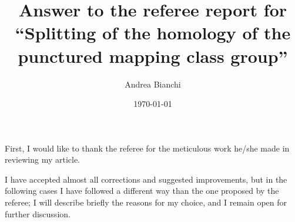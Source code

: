 \documentclass{amsart}
\begin{document}
\title{
Answer to the referee report for ``Splitting of the homology of the
punctured mapping class group''
}
\author{Andrea Bianchi}
\address{Mathematics Institute,
University of Bonn,
Endenicher Allee 60, Bonn,
Germany
}
\date{\today}
\maketitle

First, I would like to thank the referee for the meticulous work he/she made
in reviewing my article.

I have accepted almost all corrections and suggested improvements, but in the following cases
I have followed a different way than the one proposed by the referee; I will describe briefly
the reasons for my choice, and I remain open for further discussion.
\end{document}

